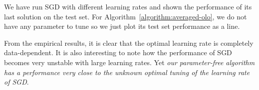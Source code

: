We have run \ac{SGD} with different learning rates and shown the performance of its last solution on the test set. For Algorithm~\ref{algorithm:averaged-olo}, we do not have any parameter to tune so we just plot its test set performance as a line.

From the empirical results, it is clear that the optimal learning rate is completely
data-dependent. It is also interesting to note how the performance of \ac{SGD} becomes very unstable with large learning rates. Yet \emph{our parameter-free algorithm has a performance very close
to the unknown optimal tuning of the learning rate of \ac{SGD}}.
